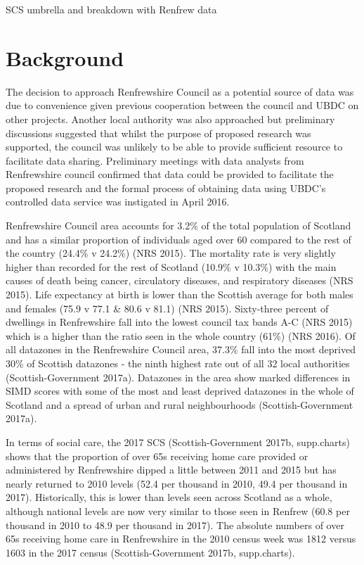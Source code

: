 \documentclass[]{article}
\begin{document}
SCS umbrella and breakdown with Renfrew data

\section{Background}\label{sec:renf-background}

The decision to approach Renfrewshire Council as a potential source of
data was due to convenience given previous cooperation between the
council and UBDC on other projects. Another local authority was also
approached but preliminary discussions suggested that whilst the purpose
of proposed research was supported, the council was unlikely to be able
to provide sufficient resource to facilitate data sharing. Preliminary
meetings with data analysts from Renfrewshire council confirmed that
data could be provided to facilitate the proposed research and the
formal process of obtaining data using UBDC's controlled data service
was instigated in April 2016.

Renfrewshire Council area accounts for 3.2\% of the total population of
Scotland and has a similar proportion of individuals aged over 60
compared to the rest of the country (24.4\% v 24.2\%) (NRS 2015). The
mortality rate is very slightly higher than recorded for the rest of
Scotland (10.9\% v 10.3\%) with the main causes of death being cancer,
circulatory diseases, and respiratory diseases (NRS 2015). Life
expectancy at birth is lower than the Scottish average for both males
and females (75.9 v 77.1 \& 80.6 v 81.1) (NRS 2015). Sixty-three percent
of dwellings in Renfrewshire fall into the lowest council tax bands A-C
(NRS 2015) which is a higher than the ratio seen in the whole country
(61\%) (NRS 2016). Of all datazones in the Renfrewshire Council area,
37.3\% fall into the most deprived 30\% of Scottish datazones - the
ninth highest rate out of all 32 local authorities (Scottish-Government
2017a). Datazones in the area show marked differences in SIMD scores
with some of the most and least deprived datazones in the whole of
Scotland and a spread of urban and rural neighbourhoods
(Scottish-Government 2017a).

In terms of social care, the 2017 SCS (Scottish-Government 2017b,
supp.charts) shows that the proportion of over 65s receiving home care
provided or administered by Renfrewshire dipped a little between 2011
and 2015 but has nearly returned to 2010 levels (52.4 per thousand in
2010, 49.4 per thousand in 2017). Historically, this is lower than
levels seen across Scotland as a whole, although national levels are now
very similar to those seen in Renfrew (60.8 per thousand in 2010 to 48.9
per thousand in 2017). The absolute numbers of over 65s receiving home
care in Renfrewshire in the 2010 census week was 1812 versus 1603 in the
2017 census (Scottish-Government 2017b, supp.charts).
\end{document}
